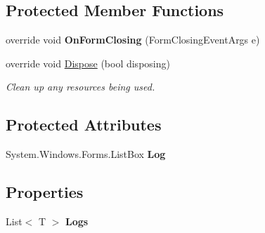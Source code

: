 \subsection*{Protected Member Functions}
\begin{DoxyCompactItemize}
\item 
\hypertarget{classlib_watcher_dialog_1_1_property_item_1_1_logger_1_1_logger_3_01_t_01_4_ada9e18811714b06abba7eb67563ebe46}{override void {\bfseries On\+Form\+Closing} (Form\+Closing\+Event\+Args e)}\label{classlib_watcher_dialog_1_1_property_item_1_1_logger_1_1_logger_3_01_t_01_4_ada9e18811714b06abba7eb67563ebe46}

\item 
override void \hyperlink{classlib_watcher_dialog_1_1_property_item_1_1_logger_1_1_logger_3_01_t_01_4_a1621c4ecc09daec93d575beb0b985ca9}{Dispose} (bool disposing)
\begin{DoxyCompactList}\small\item\em Clean up any resources being used. \end{DoxyCompactList}\end{DoxyCompactItemize}
\subsection*{Protected Attributes}
\begin{DoxyCompactItemize}
\item 
\hypertarget{classlib_watcher_dialog_1_1_property_item_1_1_logger_1_1_logger_3_01_t_01_4_ad8059d50df7c5af6ca87897bc870906a}{System.\+Windows.\+Forms.\+List\+Box {\bfseries Log}}\label{classlib_watcher_dialog_1_1_property_item_1_1_logger_1_1_logger_3_01_t_01_4_ad8059d50df7c5af6ca87897bc870906a}

\end{DoxyCompactItemize}
\subsection*{Properties}
\begin{DoxyCompactItemize}
\item 
\hypertarget{classlib_watcher_dialog_1_1_property_item_1_1_logger_1_1_logger_3_01_t_01_4_a7ecd7989dbe8b4a307359335dee774b3}{List$<$ T $>$ {\bfseries Logs}}\label{classlib_watcher_dialog_1_1_property_item_1_1_logger_1_1_logger_3_01_t_01_4_a7ecd7989dbe8b4a307359335dee774b3}

\end{DoxyCompactItemize}
